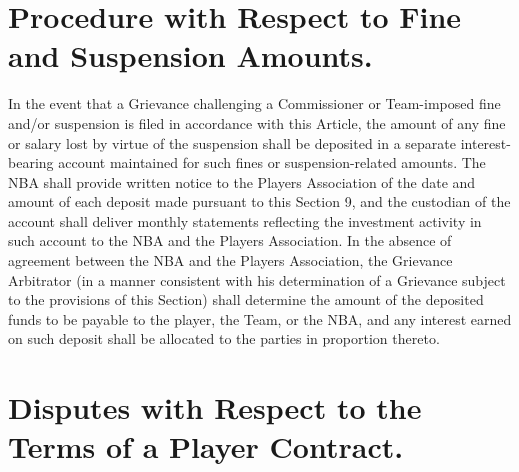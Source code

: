 \documentclass[
]{book}
\begin{document}
\hypertarget{procedure-with-respect-to-fine-and-suspension-amounts.}{%
\section{Procedure with Respect to Fine and Suspension Amounts.}\label{procedure-with-respect-to-fine-and-suspension-amounts.}}

In the event that a Grievance challenging a Commissioner or Team-imposed fine and/or suspension is filed in accordance with this Article, the amount of any fine or salary lost by virtue of the suspension shall be deposited in a separate interest-bearing account maintained for such fines or suspension-related amounts. The NBA shall provide written notice to the Players Association of the date and amount of each deposit made pursuant to this Section 9, and the custodian of the account shall deliver monthly statements reflecting the investment activity in such account to the NBA and the Players Association. In the absence of agreement between the NBA and the Players Association, the Grievance Arbitrator (in a manner consistent with his determination of a Grievance subject to the provisions of this Section) shall determine the amount of the deposited funds to be payable to the player, the Team, or the NBA, and any interest earned on such deposit shall be allocated to the parties in proportion thereto.

\hypertarget{disputes-with-respect-to-the-terms-of-a-player-contract.}{%
\section{Disputes with Respect to the Terms of a Player Contract.}\label{disputes-with-respect-to-the-terms-of-a-player-contract.}}
\end{document}
